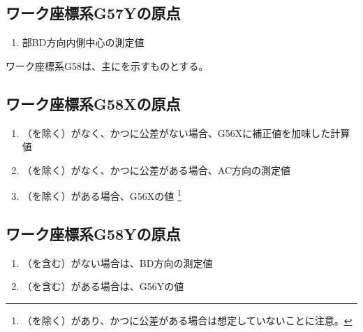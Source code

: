\subsection{ワーク座標系{\ttfamily G57Y}の原点}
\begin{enumerate}[label*=\sarrow]
\item \TopEndFace 部BD方向内側中心の測定値
\end{enumerate}



\clearpage
ワーク座標系{\ttfamily G58}は、主に\KeywayCenter を示すものとする。


\subsection{ワーク座標系{\ttfamily G58X}の原点}
\begin{enumerate}[label*=\sarrow]
\item \TopOutcut（\TopCurvedOutcut を除く）がなく、かつ\AsideKeywayDepth に公差がない場合、{\ttfamily G56X}に補正値を加味した計算値
\item \TopOutcut（\TopCurvedOutcut を除く）がなく、かつ\AsideKeywayDepth に公差がある場合、AC方向\KeywayCenter の測定値
\item \TopOutcut（\TopCurvedOutcut を除く）がある場合、{\ttfamily G56X}の値
\footnote{\TopOutcut（\TopCurvedOutcut を除く）があり、かつ\AsideKeywayDepth に公差がある場合は想定していないことに注意。}
\end{enumerate}


\subsection{ワーク座標系{\ttfamily G58Y}の原点}
\begin{enumerate}[label*=\sarrow]
\item \TopOutcut（\TopCurvedOutcut を含む）がない場合は、BD方向\KeywayCenter の測定値
\item \TopOutcut（\TopCurvedOutcut を含む）がある場合は、{\ttfamily G56Y}の値
\end{enumerate}





